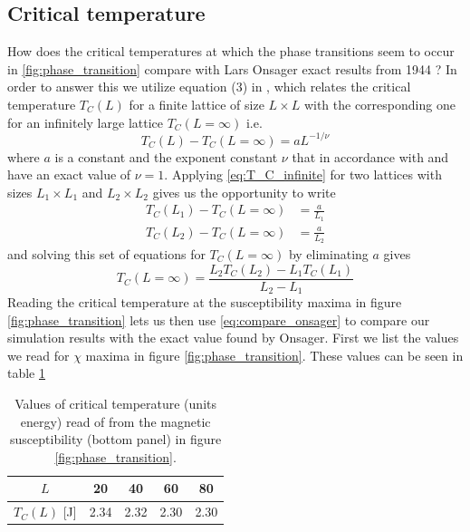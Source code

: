 \documentclass[12pt]{article}
\numberwithin{figure}{section}
\numberwithin{table}{section}
\begin{document}
\subsection{Critical temperature}
How does the critical temperatures at which the phase transitions seem to occur in \ref{fig:phase_transition} compare with Lars Onsager exact results from 1944 \cite{LarsOnsager}? In order to answer this we utilize equation (3) in \cite{pro4}, which relates the critical temperature $T_C(L)$ for a finite lattice of size $L\times L$ with the corresponding one for an infinitely large lattice $T_C(L=\infty)$ i.e.
\begin{equation}
	T_C(L)-T_C(L=\infty)=aL^{-1/\nu} \label{eq:T_C_infinite}
\end{equation}
where $a$ is a constant and the exponent constant $\nu$ that in accordance with \cite{Comp} and \cite{pro4} have an exact value of $\nu=1$. Applying \eqref{eq:T_C_infinite} for two lattices with sizes $L_1\times L_1$ and $L_2\times L_2$ gives us the opportunity to write
\begin{align*}
	T_C(L_1)-T_C(L=\infty)&=\frac{a}{L_1} \\[0.20cm]
	T_C(L_2)-T_C(L=\infty)&=\frac{a}{L_2}
\end{align*}
and solving this set of equations for $T_C(L=\infty)$ by eliminating $a$ gives
\begin{equation}
	T_C(L=\infty)=\frac{L_2T_C(L_2)-L_1T_C(L_1)}{L_2-L_1} \label{eq:compare_onsager}
\end{equation}
Reading the critical temperature at the susceptibility maxima in figure \ref{fig:phase_transition} lets us then use \eqref{eq:compare_onsager} to compare our simulation results with the exact value found by Onsager. First we list the values we read for $\chi$ maxima in figure \ref{fig:phase_transition}. These values can be seen in table \ref{tab:critic_temps}

\begin{table}[ht]
\begin{center}
\def\arraystretch{1.5}
  \begin{tabular}{| c | c | c | c | c |}
  	\hline
  	$L$ & 20 & 40 & 60 & 80 \\[0.05cm] \hline
  	$T_C(L)$ [J] & 2.34 & 2.32 & 2.30 & 2.30 \\[0.05cm] \hline
  \end{tabular}
\end{center}
\caption{Values of critical temperature (units energy) read of from the magnetic susceptibility (bottom panel) in figure \ref{fig:phase_transition}.}
\label{tab:critic_temps}
\end{table}
\end{document}

